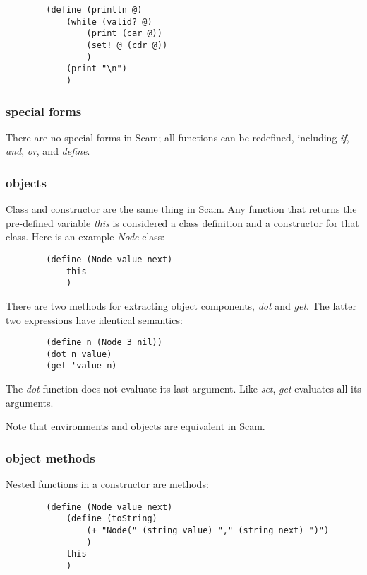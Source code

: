 \documentclass{article}
\begin{document}
\begin{verbatim}
        (define (println @)
            (while (valid? @)
                (print (car @))
                (set! @ (cdr @))
                )
            (print "\n")
            )
\end{verbatim}

\subsubsection*{special forms}

    There are no special forms in Scam; all functions can be
    redefined, including {\it if}, {\it and}, {\it or}, and {\it define}.

\subsubsection*{objects}

    Class and constructor are the same thing in Scam. Any function that
    returns the pre-defined variable {\it this} is considered a class
    definition and a constructor for that class. Here is an example
    {\it Node} class:

\begin{verbatim}
        (define (Node value next)
            this
            )
\end{verbatim}

    There are two methods for extracting object components, {\it dot} and
    {\it get}. The latter two expressions have identical semantics:

\begin{verbatim}
        (define n (Node 3 nil))
        (dot n value)
        (get 'value n)
\end{verbatim}

    The {\it dot} function does not evaluate its last argument.
    Like {\it set}, {\it get} evaluates all its arguments.

    Note that environments and objects are equivalent in Scam.

\subsubsection*{object methods}

    Nested functions in a constructor are methods:

\begin{verbatim}
        (define (Node value next)
            (define (toString)
                (+ "Node(" (string value) "," (string next) ")")
                )
            this
            )
\end{verbatim}
\end{document}
